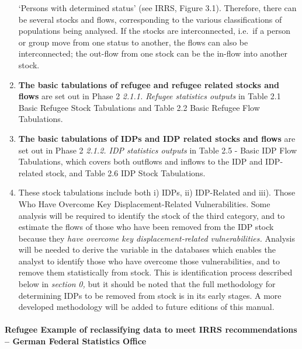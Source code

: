 \documentclass[
]{article}
\begin{document}
\begin{enumerate}
  `Persons with determined status' (see IRRS, Figure 3.1). Therefore,
  there can be several stocks and flows, corresponding to the various
  classifications of populations being analysed. If the stocks are
  interconnected, i.e.~if a person or group move from one status to
  another, the flows can also be interconnected; the out-flow from one
  stock can be the in-flow into another stock.
\item
  \textbf{The basic tabulations of refugee and refugee related stocks and
  flows} are set out in Phase 2 \emph{2.1.1. Refugee statistics outputs}
  in Table 2.1 Basic Refugee Stock Tabulations and Table 2.2 Basic
  Refugee Flow Tabulations.
\item
  \textbf{The basic tabulations of IDPs and IDP related stocks and flows}
  are set out in Phase 2 \emph{2.1.2. IDP statistics outputs} in Table
  2.5 - Basic IDP Flow Tabulations, which covers both outflows and
  inflows to the IDP and IDP-related stock, and Table 2.6 IDP Stock
  Tabulations.
\item
  These stock tabulations include both i) IDPs, ii) IDP-Related and
  iii). Those Who Have Overcome Key Displacement-Related
  Vulnerabilities. Some analysis will be required to identify the
  stock of the third category, and to estimate the flows of those who
  have been removed from the IDP stock because they \emph{have overcome key
  displacement-related vulnerabilities.} Analysis will be needed to
  derive the variable in the databases which enables the analyst to
  identify those who have overcome those vulnerabilities, and to
  remove them statistically from stock. This is identification process
  described below in \emph{section} \emph{0,} but it should be noted that the
  full methodology for determining IDPs to be removed from stock is in
  its early stages. A more developed methodology will be added to
  future editions of this manual.
\end{enumerate}

\hypertarget{refugee-example-of-reclassifying-data-to-meet-irrs-recommendations-german-federal-statistics-office-1}{%
\paragraph{Refugee Example of reclassifying data to meet IRRS recommendations -- German Federal Statistics Office}\label{refugee-example-of-reclassifying-data-to-meet-irrs-recommendations-german-federal-statistics-office-1}}
\end{document}
